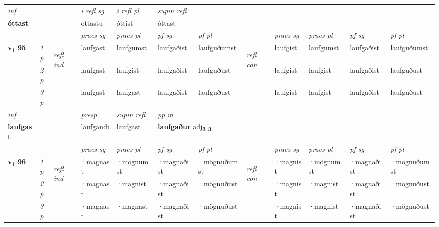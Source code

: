 \begin{longtable}[l]{X>{\footnotesize\itshape}llXXXXlXXXX}
   {\textit{inf}} & &   & \textit{i refl sg} & \textit{i refl pl}   & \textit{supin refl}  \\*
  {\textbf{óttast}} & &   & óttastu & óttist   & óttast  \\*

\midrule

 & &   & \textit{praes sg}  & \textit{praes pl}    & \textit{ pf sg} & \textit{pf pl} & & \textit{praes sg}  & \textit{praes pl}    & \textit{pf sg} & \textit{pf pl }  \\ \cmidrule{4-7} \cmidrule{9-12}
 \multirow{2}{*}{{{\textbf{v{\textsubscript{1}}} \Large{\textbf{95}}}}}  & 1p & \multirow{3}{*}{\begin{turn}{90}\textit{refl ind}\end{turn}}  & laufgast & laufgumst & laufgaðist & laufguðumst & \multirow{3}{*}{\begin{turn}{90}\textit{refl con}\end{turn}}  &laufgist & laufgumst & laufgaðist & laufguðumst \\*
 & 2p &  & laufgast & laufgist & laufgaðist & laufguðust & &laufgist & laufgist & laufgaðist & laufguðust \\*
 & 3p  & & laufgast & laufgast & laufgaðist & laufguðust & & laufgist & laufgist& laufgaðist & laufguðust \\*
\cmidrule{4-7} \cmidrule{9-12}

   {\textit{inf}} & &     & \textit{presp}  & \textit{supin refl} & \textit{pp m} \\*
  {\textbf{laufgast}} & &     & laufgandi  & laufgast & \multicolumn{2}{l}{\textbf{laufgaður} adj\textbf{\textsubscript{3-3}}} \\*

\midrule

 & &   & \textit{praes sg}  & \textit{praes pl}    & \textit{ pf sg} & \textit{pf pl} & & \textit{praes sg}  & \textit{praes pl}    & \textit{pf sg} & \textit{pf pl }  \\ \cmidrule{4-7} \cmidrule{9-12}
 \multirow{2}{*}{{{\textbf{v{\textsubscript{1}}} \Large{\textbf{96}}}}}  & 1p & \multirow{3}{*}{\begin{turn}{90}\textit{refl ind}\end{turn}}  & ·magnast & ·mögnumst & ·magnaðist & ·mögnuðumst & \multirow{3}{*}{\begin{turn}{90}\textit{refl con}\end{turn}}  &·magnist & ·mögnumst & ·magnaðist & ·mögnuðumst \\*
 & 2p &  & ·magnast & ·magnist & ·magnaðist & ·mögnuðust & &·magnist & ·magnist & ·magnaðist & ·mögnuðust \\*
 & 3p  & & ·magnast & ·magnast & ·magnaðist & ·mögnuðust & & ·magnist & ·magnist& ·magnaðist & ·mögnuðust \\*
\cmidrule{4-7} \cmidrule{9-12}


\end{longtable}
